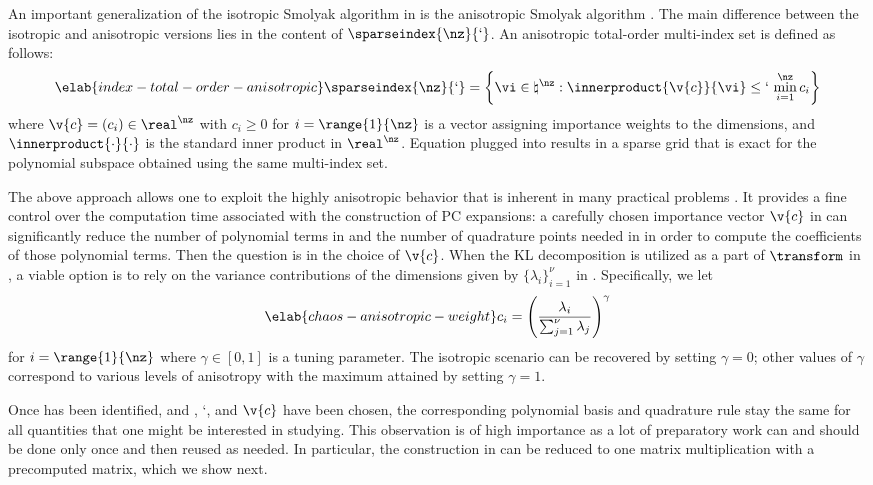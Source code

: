 An important generalization of the isotropic Smolyak algorithm in
 is the anisotropic Smolyak algorithm
\cite{nobile2008}. The main difference between the isotropic and anisotropic
versions lies in the content of $\sparseindex{\nz}{\lq}$. An anisotropic
total-order multi-index set is defined as follows:
\begin{equation} \elab{index-total-order-anisotropic}
  \sparseindex{\nz}{\lq} = \left\{ \vi \in \natural^\nz: \innerproduct{\v{c}}{\vi} \leq \lq \, \min_{i = 1}^\nz c_i \right\}
\end{equation}
where $\v{c} = (c_i) \in \real^\nz$ with $c_i \geq 0$ for $i = \range{1}{\nz}$
is a vector assigning importance weights to the dimensions, and
$\innerproduct{\cdot}{\cdot}$ is the standard inner product in $\real^\nz$.
Equation  plugged into
 results in a sparse grid that is exact for the
polynomial subspace obtained using the same multi-index set.

The above approach allows one to exploit the highly anisotropic behavior that is
inherent in many practical problems \cite{nobile2008}. It provides a fine
control over the computation time associated with the construction of \ac{PC}
expansions: a carefully chosen importance vector $\v{c}$ in
 can significantly reduce the number of
polynomial terms in  and the number of quadrature points
needed in  in order to compute the coefficients of those
polynomial terms. Then the question is in the choice of $\v{c}$. When the
\ac{KL} decomposition is utilized as a part of $\transform$ in
, a viable option is to rely on the variance
contributions of the dimensions given by $\{ \lambda_i \}_{i = 1}^\nu$ in
. Specifically, we let
\begin{equation} \elab{chaos-anisotropic-weight}
  c_i = \left(\frac{\lambda_i}{\sum_{j = 1}^\nu \lambda_j}\right)^\gamma
\end{equation}
for $i = \range{1}{\nz}$ where $\gamma \in [0, 1]$ is a tuning parameter. The
isotropic scenario can be recovered by setting $\gamma = 0$; other values of
$\gamma$ correspond to various levels of anisotropy with the maximum attained by
setting $\gamma = 1$.

Once \vz has been identified, and \lc, \lq, and $\v{c}$ have been chosen, the
corresponding polynomial basis and quadrature rule stay the same for all
quantities that one might be interested in studying. This observation is of high
importance as a lot of preparatory work can and should be done only once and
then reused as needed. In particular, the construction in 
can be reduced to one matrix multiplication with a precomputed matrix, which we
show next.

